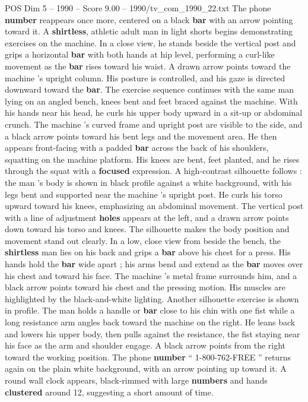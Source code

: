 \begin{textsample}{POS Dim 5 – 1990 – Score 9.00 – 1990/tv\_com\_1990\_22.txt}
The phone \textbf{number} reappears once more, centered on a black \textbf{bar} with an arrow pointing toward it.
A \textbf{shirtless}, athletic adult man in light shorts begins demonstrating exercises on the machine.
In a close view, he stands beside the vertical post and grips a horizontal \textbf{bar} with both hands at hip level, performing a curl-like movement as the \textbf{bar} rises toward his waist.
A drawn arrow points toward the machine ’s upright column.
His posture is controlled, and his gaze is directed downward toward the \textbf{bar}.
The exercise sequence continues with the same man lying on an angled bench, knees bent and feet braced against the machine.
With his hands near his head, he curls his upper body upward in a sit-up or abdominal crunch.
The machine ’s curved frame and upright post are visible to the side, and a black arrow points toward his bent legs and the movement area.
He then appears front-facing with a padded \textbf{bar} across the back of his shoulders, squatting on the machine platform.
His knees are bent, feet planted, and he rises through the squat with a \textbf{focused} expression.
A high-contrast silhouette follows : the man ’s body is shown in black profile against a white background, with his legs bent and supported near the machine ’s upright post.
He curls his torso upward toward his knees, emphasizing an abdominal movement.
The vertical post with a line of adjustment \textbf{holes} appears at the left, and a drawn arrow points down toward his torso and knees.
The silhouette makes the body position and movement stand out clearly.
In a low, close view from beside the bench, the \textbf{shirtless} man lies on his back and grips a \textbf{bar} above his chest for a press.
His hands hold the \textbf{bar} wide apart ; his arms bend and extend as the \textbf{bar} moves over his chest and toward his face.
The machine ’s metal frame surrounds him, and a black arrow points toward his chest and the pressing motion.
His muscles are highlighted by the black-and-white lighting.
Another silhouette exercise is shown in profile.
The man holds a handle or \textbf{bar} close to his chin with one fist while a long resistance arm angles back toward the machine on the right.
He leans back and lowers his upper body, then pulls against the resistance, the fist staying near his face as the arm and shoulder engage.
A black arrow points from the right toward the working position.
The phone \textbf{number} “ 1-800-762-FREE ” returns again on the plain white background, with an arrow pointing up toward it.
A round wall clock appears, black-rimmed with large \textbf{numbers} and hands \textbf{clustered} around 12, suggesting a short amount of time.

\end{textsample}
